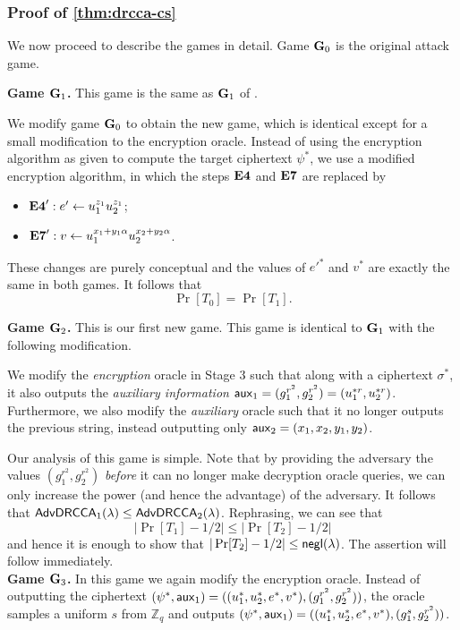 \subsubsection{Proof of \cref{thm:drcca-cs}}

We now proceed to describe the games in detail. Game $\mathbf{G}_0$ is the original attack game.

\textbf{Game $\mathbf{G}_1$.} This game is the same as $\mathbf{G}_1$ of \cite{cs01}. 

We modify game $\mathbf{G}_0$ to obtain the new game, which is identical except for a small modification to the encryption oracle. Instead of using the encryption algorithm as given to compute the target ciphertext $\psi^{*}$, we use a modified encryption algorithm, in which the steps $\mathbf{E4}$ and $\mathbf{E7}$ are replaced by 
\begin{itemize}
	\item[] $\mathbf{E4}': e'\gets u_1^{z_1}u_2^{z_1}$;
	\item[] $\mathbf{E7}': v\gets u_1^{x_1+y_1\alpha}u_2^{x_2+y_2\alpha}$.
\end{itemize}
These changes are purely conceptual and the values of $e'^{*}$ and $v^{*}$ are exactly the same in both games. It follows that $$\Pr[T_0]=\Pr[T_1].$$

\textbf{Game $\mathbf{G}_2$.} This is our first new game. This game is identical to $\mathbf{G}_1$ with the following modification.

We modify the \textit{encryption} oracle in Stage $3$ such that along with a ciphertext $\sigma^{*}$, it also outputs the \textit{auxiliary information} $\mathsf{aux}_1 = (g_1^{r^2}, g_2^{r^2}) = (u_1^{*r}, u_2^{*r})$. Furthermore, we also modify the \textit{auxiliary} oracle such that it no longer outputs the previous string, instead outputting only $\mathsf{aux}_2 = (x_1,x_2,y_1,y_2)$. 

Our analysis of this game is simple. Note that by providing the adversary the values $(g_1^{r^2}, g_2^{r^2})$ \textit{before} it can no longer make decryption oracle queries, we can only increase the power (and hence the advantage) of the adversary. It follows that $\mathsf{AdvDRCCA}_1(\lambda)\leq\mathsf{AdvDRCCA}_2(\lambda)$. Rephrasing, we can see that $$|\Pr[T_1]-1/2|\leq|\Pr[T_2]-1/2|$$ and hence it is enough to show that $|\Pr[T_2]-1/2|\leq\mathsf{negl}(\lambda)$. The assertion will follow immediately.\\

\textbf{Game $\mathbf{G}_3$.} In this game we again modify the encryption oracle. Instead of outputting the ciphertext $(\psi^{*}, \mathsf{aux}_1) = ((u_1^{*}, u_2^{*}, e^{*}, v^{*}), (g_1^{r^2}, g_2^{r^2}))$, the oracle samples a uniform $s$ from $\mathbb{Z}_{q}$ and outputs $(\psi^{*}, \mathsf{aux}_1) = ((u_1^{*}, u_2^{*}, e^{*}, v^{*}), (g_1^{s}, g_2^{r^2}))$. 

